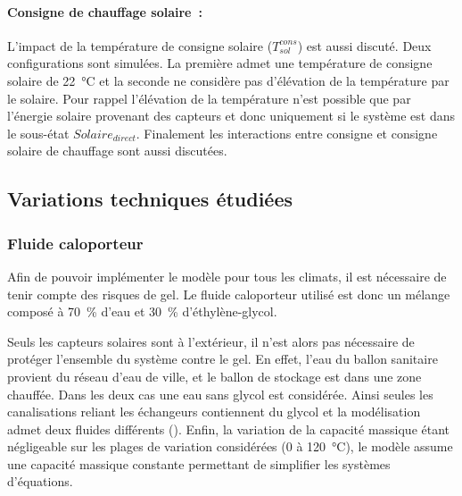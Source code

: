 \paragraph{Consigne de chauffage solaire~:} %
\label{par:consigne_de_chauffage_solaire}
L’impact de la température de consigne solaire ($T^{cons}_{sol}$) est aussi discuté. Deux
configurations sont simulées. La première admet une température de consigne solaire de
\SI{22}{\celsius} et la seconde ne considère pas d’élévation de la température par le
solaire. Pour rappel l’élévation de la température n’est possible que par l’énergie
solaire provenant des capteurs et donc uniquement si le système est dans le sous-état
$Solaire_{direct}$. Finalement les interactions entre consigne et consigne solaire de
chauffage sont aussi discutées.


\subsection{Variations techniques étudiées} %
\label{sub:variations_techniques_etudiees}
\subsubsection{Fluide caloporteur} %
\label{ssub:fluide_caloporteur}
Afin de pouvoir implémenter le modèle pour tous les climats, il est nécessaire de
tenir compte des risques de gel. Le fluide caloporteur utilisé est donc un
mélange composé à \SI{70}{\percent} d’eau et \SI{30}{\percent} d’éthylène-glycol.

Seuls les capteurs solaires sont à l’extérieur, il n’est alors pas nécessaire de protéger
l’ensemble du système contre le gel. En effet, l’eau du ballon sanitaire provient du
réseau d’eau de ville, et le ballon de stockage est dans une zone chauffée. Dans les
deux cas une eau sans glycol est considérée. Ainsi seules les canalisations reliant les
échangeurs contiennent du glycol et la modélisation admet deux fluides différents
(). Enfin, la variation de la capacité massique étant négligeable sur
les plages de variation considérées (\num{0} à \SI{120}{\celsius}), le modèle assume une
capacité massique constante permettant de simplifier les systèmes d’équations.

